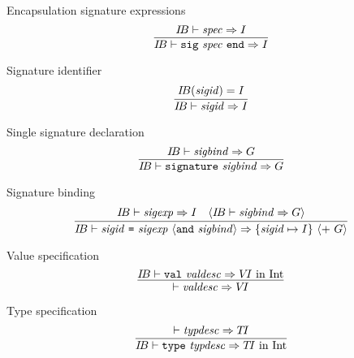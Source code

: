 \begin{inference-rule}{Encapsulation signature expressions}
\begin{equation}\label{rule:dynamic-modules:encapsulating-sigexp}
\vcenter{\infer{\IB\ts\encsigexp\ra\I}
  {\IB\ts\spec\ra\I}}
\end{equation}
\end{inference-rule}

\begin{inference-rule}{Signature identifier}
\begin{equation}\label{rule:dynamic-modules:signature-identifier}
\vcenter{\infer{\IB\ts\sigid\ra\I}
  {\IB(\sigid)=\I}}
\end{equation}
\end{inference-rule}



\begin{inference-rule}{Single signature declaration}
\begin{equation}\label{rule:dynamic-modules:single-signature-declaration}
\vcenter{\infer{\IB\ts\singsigdec\ra\G}
  {\IB\ts\sigbind\ra\G}}
\end{equation}
\end{inference-rule}


\begin{inference-rule}{Signature binding}
\begin{equation}\label{rule:dynamic-modules:signature-binding}
\vcenter{\infer{\IB\ts\sigbinder\ra\{\sigid\mapsto\I\}
       \ \optional{ +\ \G}}
  {\IB\ts\sigexp\ra\I
    &\optional{\IB\ts\sigbind\ra\G}}}
\end{equation}
\end{inference-rule}


\begin{inference-rule}{Value specification}
\begin{equation}\label{rule:dynamic-modules:value-specification}
\vcenter{\infer{\ts\valdesc\ra\VI}
  {\IB\ts\valspec\ra\VI\ \In\ \Int}}
\end{equation}
\end{inference-rule}

\begin{inference-rule}{Type specification}
\begin{equation}\label{rule:dynamic-modules:type-spec}
\vcenter{\infer{\IB\ts\typespec\ra\TI\ \In\ \Int}
  {\ts\typdesc\ra\TI}}
\end{equation}
\end{inference-rule}

